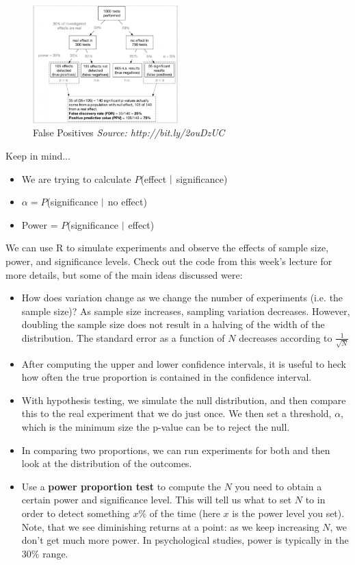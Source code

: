 \begin{figure}[ht]
  \begin{center}
    \includegraphics[width=0.5\textwidth]{figures/fig4}
        \caption{False Positives \textit{ Source: http://bit.ly/2ouDzUC}}
    \label{figure 3}
  \end{center}
\end{figure}

Keep in mind...
\begin{itemize}
\item We are trying to calculate $P$(effect $\arrowvert$ significance)
\item $\alpha=P$(significance $\arrowvert$ no effect)
\item Power = $P$(significance $\arrowvert$ effect)\\
\end{itemize}

We can use R to simulate experiments and observe the effects of sample size, power, and significance levels.   Check out the code from this week's lecture for more details, but some of the main ideas discussed were:

\begin{itemize}
\item How does variation change as we change the number of experiments (i.e. the sample size)?   As sample size increases, sampling variation decreases.  However, doubling the sample size does not result in a halving of the width of the distribution.  The standard error as a function of $N$ decreases according to $\frac{1}{\sqrt{N}}$
\item After computing the upper and lower confidence intervals, it is useful to heck how often the true proportion is contained in the confidence interval.  
\item With hypothesis testing, we simulate the null distribution, and then compare this to the real experiment that we do just once.  We then set a threshold, $\alpha$, which is the minimum size the p-value can be to reject the null.
\item In comparing two proportions, we can run experiments for both and then look at the distribution of the outcomes. 
\item Use a \textbf{power proportion test} to compute the $N$ you need to obtain a certain power and significance level.  This will tell us what to set $N$ to in order to detect something $x\%$ of the time (here $x$ is the power level you set). Note, that we see diminishing returns at a point: as we keep increasing $N$, we don't get much more power.  In psychological studies, power is typically in the 30$\%$ range. 
\end{itemize}

